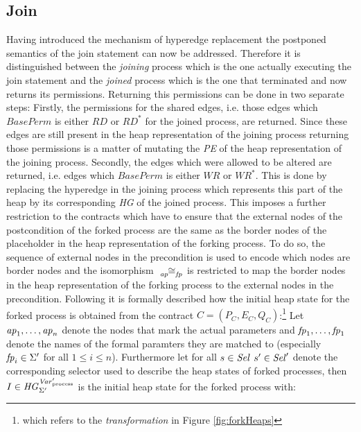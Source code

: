 	\subsection{Join}
	\label{sec:join}
	Having introduced the mechanism of hyperedge replacement the postponed
	semantics of the join statement can now be addressed. Therefore
	it is distinguished between the \emph{joining} process which is the one
	actually executing the join statement and the \emph{joined} process
	which is the one that terminated and now returns its permissions.
	Returning this permissions can be done in two separate steps:
	Firstly, the permissions for the shared edges, i.e. those edges which
	$\mathit{BasePerm}$ is either $\mathit{RD}$ or $\mathit{RD^{\ast}}$ for the
	joined process, are returned.
	Since these edges are still present in the heap representation of the
	joining process returning those permissions is a
	matter of mutating the \emph{\ac{PE}} of the heap representation of
	the joining process. Secondly, the edges which were allowed to be
	altered are returned, i.e. edges which $\mathit{BasePerm}$ is either
	$\mathit{WR}$ or $\mathit{WR^{\ast}}$. This is done by replacing the
	hyperedge in the joining process which represents this part of the
	heap by its corresponding \emph{\ac{HG}} of the joined
	process. This imposes a further restriction to the contracts which have to
	ensure that the external nodes of the postcondition of the forked process
	are the same as the border nodes of the placeholder in the heap
	representation of the forking process. To do so, the sequence of external
	nodes in the precondition is used to encode which nodes are border nodes
	and the isomorphism $\afiso$ is restricted to map the border nodes in the
	heap representation of the forking process to the external nodes in the
	precondition. Following it is formally described how the initial heap state
	for the forked process is obtained from the contract
	$C = (P_C, E_C, Q_C)$:\footnote{which refers to the \emph{transformation} in
	Figure \ref{fig:forkHeaps}}
	Let $\mathit{ap}_{1},\dots,\mathit{ap}_{n}$ denote the nodes that mark the actual parameters
	and $\mathit{fp}_{1},\dots,\mathit{fp}_{1}$ denote the names of the formal paramters they
	are matched to (especially $\mathit{fp}_{i}\in\Sigma'$ for all $1\leq i\leq n$).
	Furthermore let for all $s\in\mathit{Sel}$ $s'\in\mathit{Sel}'$ denote the corresponding
	selector used to describe the heap states of forked processes,
	then $I \in\mathit{HG}^{\mathit{Var}_{\text{process}}'}_{\Sigma'}$ is the initial heap state for the
	forked process with:
